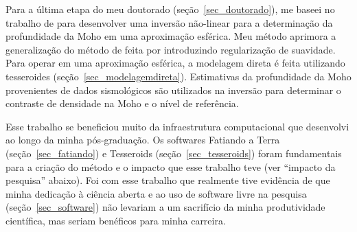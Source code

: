 \documentclass[10pt,a4paper,oneside]{book}
\begin{document}
Para a última etapa do meu doutorado (seção~\ref{sec_doutorado}), me baseei no
trabalho de \citet{Silva2014} para desenvolver uma inversão não-linear para
a determinação da profundidade da Moho em uma aproximação esférica.
Meu método aprimora a generalização do método de \citet{Bott1960} feita por
\citet{Silva2014} introduzindo regularização de suavidade.
Para operar em uma aproximação esférica, a modelagem direta é feita utilizando
tesseroides (seção~\ref{sec_modelagemdireta}).
Estimativas da profundidade da Moho provenientes de dados sismológicos são
utilizados na inversão para determinar o contraste de densidade na Moho e o
nível de referência.

Esse trabalho se beneficiou muito da infraestrutura computacional que
desenvolvi ao longo da minha pós-graduação.
Os softwares Fatiando a Terra (seção~\ref{sec_fatiando}) e Tesseroids
(seção~\ref{sec_tesseroids}) foram fundamentais para a criação do método e
o impacto que esse trabalho teve (ver ``impacto da pesquisa'' abaixo).
Foi com esse trabalho que realmente tive evidência de que minha dedicação à
ciência aberta e ao uso de software livre na pesquisa
(seção~\ref{sec_software}) não levariam a um sacrifício da minha produtividade científica,
mas seriam benéficos para minha carreira.
\end{document}
